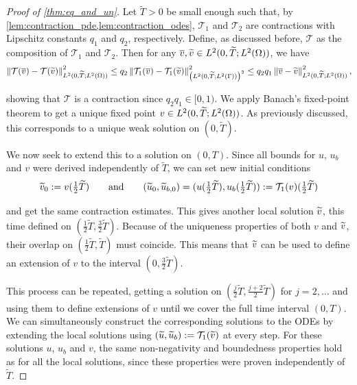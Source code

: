 \begin{proof}[Proof of \cref{thm:eq_and_un}]
    Let $\widetilde{T} > 0$ be small enough such that, by \cref{lem:contraction_pde,lem:contraction_odes}, $\mathcal{T}_1$ and $\mathcal{T}_2$ are contractions with Lipschitz constants $q_1$ and $q_2$, respectively. Define, as discussed before, $\mathcal{T}$ as the composition of $\mathcal{T}_1$ and $\mathcal{T}_2$. Then for any $\overline{v}, \widetilde{v} \in L^2(0, \widetilde{T}; L^2(\Omega))$, we have
%
    \begin{equation*}
        \left\| \mathcal{T}(\overline{v}) - \mathcal{T}(\widetilde{v}) \right\|_{L^2(0, \widetilde{T}; L^2(\Omega))}^2 \leq q_2 \left\| \mathcal{T}_1(\overline{v}) - \mathcal{T}_1(\widetilde{v}) \right\|_{\left(L^2(0, \widetilde{T}; L^2(\Gamma))\right)^2}^2 \leq q_2 q_1 \left\| \overline{v} - \widetilde{v} \right\|_{L^2(0, \widetilde{T}; L^2(\Omega))}^2 ,
    \end{equation*}

    \noindent
    showing that $\mathcal{T}$ is a contraction since $q_2 q_1 \in [0, 1)$. We apply Banach's fixed-point theorem to get a unique fixed point $v \in L^2(0, \widetilde{T}; L^2(\Omega))$. As previously discussed, this corresponds to a unique weak solution on $(0, \widetilde{T})$. 
    
    We now seek to extend this to a solution on $(0, T)$. Since all bounds for $u$, $u_b$ and $v$ were derived independently of $\widetilde{T}$, we can set new initial conditions
    \begin{equation*}
        \widetilde{v}_0 := v(\tfrac12 \widetilde{T}) \qquad \text{and} \qquad(\widetilde{u}_0, \widetilde{u}_{b,0}) = (u(\tfrac12 \widetilde{T}), u_b(\tfrac12 \widetilde{T})) := \mathcal{T}_1(v)(\tfrac12 \widetilde{T})
    \end{equation*}
    
    \noindent
    and get the same contraction estimates. This gives another local solution $\widetilde{v}$, this time defined on $(\frac12 \widetilde{T}, \frac32 \widetilde{T})$. Because of the uniqueness properties of both $v$ and $\widetilde{v}$, their overlap on $(\frac12 \widetilde{T}, \widetilde{T})$ must coincide. This means that $\widetilde{v}$ can be used to define an extension of $v$ to the interval $(0, \frac32 \widetilde{T})$.

    This process can be repeated, getting a solution on $(\frac{j}{2} \widetilde{T}, \frac{j + 2}{2} \widetilde{T})$ for $j = 2, \dots$ and using them to define extensions of $v$ until we cover the full time interval $(0, T)$. We can simultaneously construct the corresponding solutions to the ODEs by extending the local solutions using $(\widetilde{u}, \widetilde{u}_b) := \mathcal{T}_1(\widetilde{v})$ at every step. For these solutions $u$, $u_b$ and $v$, the same non-negativity and boundedness properties hold as for all the local solutions, since these properties were proven independently of $\widetilde{T}$.
\end{proof}

